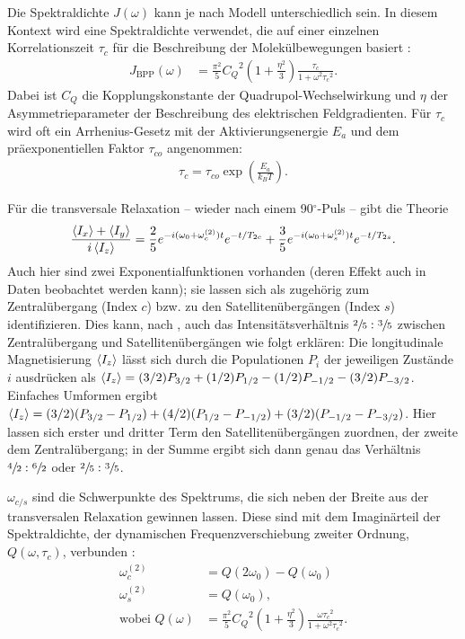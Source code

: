 Die Spektraldichte $J(\omega)$ kann je nach Modell unterschiedlich sein. In diesem Kontext wird eine Spektraldichte verwendet, die auf einer einzelnen Korrelationszeit $\tau_c$ für die Beschreibung der Molekülbewegungen basiert \cite{eckert}:
\begin{align}
    J_\text{BPP}(\omega) &= \frac{\pi^2}{5} {C_Q}^2 \left( 1 + \frac{\eta^2}{3} \right) \frac{\tau_c}{1 + \omega^2 {\tau_c}^2}. \label{eqn:spektraldichte_j}
\end{align}
Dabei ist $C_Q$ die Kopplungskonstante der Quadrupol-Wechselwirkung und $\eta$ der Asymmetrieparameter der Beschreibung des elektrischen Feldgradienten. Für $\tau_c$ wird oft ein Arrhenius-Gesetz mit der Aktivierungsenergie $E_a$ und dem präexponentiellen Faktor $\tau_{co}$ angenommen:
\begin{align}
    \tau_c = \tau_{co} \exp \left( \frac{E_a}{k_B T} \right).
\end{align}


Für die transversale Relaxation -- wieder nach einem 90$^\circ$-Puls -- gibt die Theorie \cite{werbelow}
\begin{align}
    \frac{\Braket{I_x} + \Braket{I_y}}{i\Braket{I_z}} = \frac{2}{5}e^{-i(\omega_0 + \omega_c^{(2)})t}e^{-t/T_{2c}} + \frac{3}{5}e^{-i(\omega_0 + \omega_s^{(2)})t}e^{-t/T_{2s}}. \label{eqn:trans_relax}
\end{align}
Auch hier sind zwei Exponentialfunktionen vorhanden (deren Effekt auch in Daten beobachtet werden kann); sie lassen sich als zugehörig zum Zentralübergang (Index $c$) bzw. zu den Satellitenübergängen (Index $s$) identifizieren. Dies kann, nach \cite{werbelow}, auch das Intensitätsverhältnis $\sfrac{2}{5}:\sfrac{3}{5}$ zwischen Zentralübergang und Satellitenübergängen wie folgt erklären: Die longitudinale Magnetisierung $\Braket{I_z}$ lässt sich durch die Populationen $P_i$ der jeweiligen Zustände $i$ ausdrücken als $\Braket{I_z} = (3/2)P_{3/2} + (1/2)P_{1/2} - (1/2)P_{-1/2} - (3/2)P_{-3/2}$. Einfaches Umformen ergibt $\Braket{I_z} = (3/2)(P_{3/2} - P_{1/2}) + (4/2)(P_{1/2} - P_{-1/2}) + (3/2)(P_{-1/2} - P_{-3/2})$. Hier lassen sich erster und dritter Term den Satellitenübergängen zuordnen, der zweite dem Zentralübergang; in der Summe ergibt sich dann genau das Verhältnis $\sfrac{4}{2}:\sfrac{6}{2}$ oder $\sfrac{2}{5}:\sfrac{3}{5}$.

$\omega_{c/s}$ sind die Schwerpunkte des Spektrums, die sich neben der Breite aus der transversalen Relaxation gewinnen lassen. Diese sind mit dem Imaginärteil der Spektraldichte, der dynamischen Frequenzverschiebung zweiter Ordnung, $Q(\omega, \tau_c)$, verbunden \cite{eckert}:
\begin{align}
    \omega_c^{(2)} &= Q(2\omega_0) - Q(\omega_0) \\ \label{eqn:schwerpunkt}
    \omega_s^{(2)} &= Q(\omega_0), \\
    \text{wobei } Q(\omega) &= \frac{\pi^2}{5} {C_Q}^2 \left( 1 + \frac{\eta^2}{3} \right) \frac{\omega {\tau_c}^2}{1 + \omega^2 {\tau_c}^2}.
\end{align}

